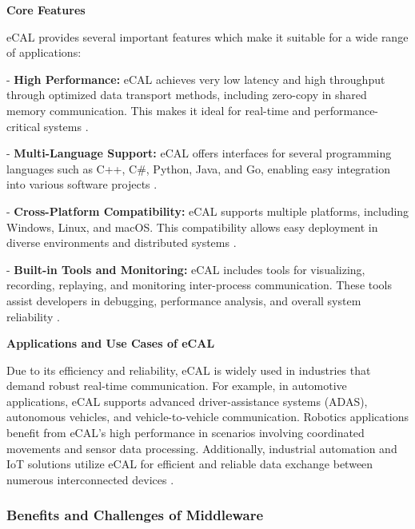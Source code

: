 \textbf{Core Features}

\vspace{0.4em}
eCAL provides several important features which make it suitable for a wide range of applications:

\vspace{1em}
- \textbf{High Performance:} eCAL achieves very low latency and high throughput through optimized data transport methods, including zero-copy in shared memory communication. This makes it ideal for real-time and performance-critical systems \cite{ecal_github,ecal_official_docs}.
\vspace{1em}

- \textbf{Multi-Language Support:} eCAL offers interfaces for several programming languages such as C++, C\#, Python, Java, and Go, enabling easy integration into various software projects \cite{ecal_official_docs}.

\vspace{1em}
- \textbf{Cross-Platform Compatibility:} eCAL supports multiple platforms, including Windows, Linux, and macOS. This compatibility allows easy deployment in diverse environments and distributed systems \cite{ecal_official_docs}.

\vspace{1em}
- \textbf{Built-in Tools and Monitoring:} eCAL includes tools for visualizing, recording, replaying, and monitoring inter-process communication. These tools assist developers in debugging, performance analysis, and overall system reliability \cite{ecal_github,ecal_official_docs}.

\vspace{1em}

\newpage
\textbf{Applications and Use Cases of eCAL}

\vspace{0.4em}
Due to its efficiency and reliability, eCAL is widely used in industries that demand robust real-time communication. For example, in automotive applications, eCAL supports advanced driver-assistance systems (ADAS), autonomous vehicles, and vehicle-to-vehicle communication. Robotics applications benefit from eCAL's high performance in scenarios involving coordinated movements and sensor data processing. Additionally, industrial automation and IoT solutions utilize eCAL for efficient and reliable data exchange between numerous interconnected devices \cite{ecal_github,ecal_official_docs}.

\subsubsection{Benefits and Challenges of Middleware}

